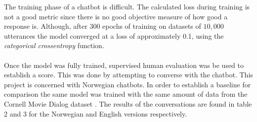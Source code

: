 \documentclass{article}
\begin{document}
The training phase of a chatbot is difficult. The calculated loss during
training is not a good metric since there is no good objective measure of how
good a response is. Although, after 300 epochs of training on datasets of
$10, 000$ utterances the model converged at a loss of  approximately 0.1, using
the \textit{categorical crossentropy} function.

\paragraph{}
Once the model was fully trained, supervised human evaluation was be used to
establish a score. This was done by attempting to converse with the chatbot. 
This project is concerned with Norwegian chatbots. In order to establish a
baseline for comparison the same model was trained with the same amount of data
from the Cornell Movie Dialog dataset \cite{cornell-corpus}. The results of the
conversations are found in table 2 and 3 for the Norwegian and English versions
respectively.
\end{document}
